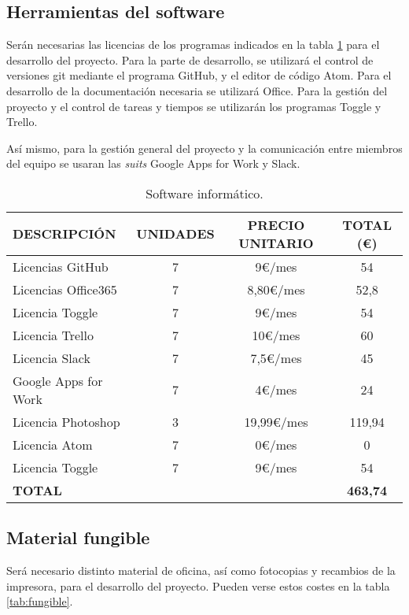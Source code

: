 \subsection{Herramientas del software}
\par Serán necesarias las licencias de los programas indicados en la tabla \ref{tab:software} para el desarrollo del proyecto. Para la parte de desarrollo, se utilizará el control de versiones git mediante el programa GitHub, y el editor de código Atom. Para el desarrollo de la documentación necesaria se utilizará Office. Para la gestión del proyecto y el control de tareas y tiempos se utilizarán los programas Toggle y Trello.
\par Así mismo, para la gestión general del proyecto y la comunicación entre miembros del equipo se usaran las \textit{suits} Google Apps for Work y Slack.


\begin{table}[H]
\begin{center}
\begin{tabular}{l c c c}
\textbf{DESCRIPCIÓN} & \textbf{UNIDADES} & \textbf{PRECIO UNITARIO} & \textbf{TOTAL (\euro)}\\ \hline \hline
Licencias GitHub & 7 & 9\euro/mes & 54\\
Licencias Office365 & 7 & 8,80\euro/mes & 52,8\\
Licencia Toggle & 7 & 9\euro/mes & 54\\
Licencia Trello & 7 & 10\euro/mes & 60\\
Licencia Slack & 7 & 7,5\euro/mes & 45\\
Google Apps for Work & 7 & 4\euro/mes & 24\\
Licencia Photoshop & 3 & 19,99\euro/mes & 119,94\\
Licencia Atom & 7 & 0\euro/mes & 0\\
Licencia Toggle & 7 & 9\euro/mes & 54\\ \hline \hline
\textbf{TOTAL} & & & \textbf{463,74}\\ \hline
\end{tabular}
\caption{Software informático.}
\label{tab:software}
\end{center}
\end{table}



\subsection{Material fungible}
\par Será necesario distinto material de oficina, así como fotocopias y recambios de la impresora, para el desarrollo del proyecto. Pueden verse estos costes en la tabla \ref{tab:fungible}.


